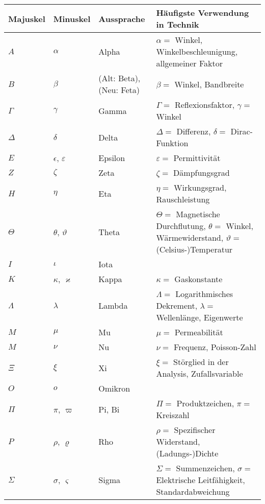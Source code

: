 \begin{tabular}{|l|l|l|m{8.8cm}|}
	\hline
	\textbf{Majuskel}	& \textbf{Minuskel}			& \textbf{Aussprache}		& \textbf{Häufigste Verwendung in Technik} \\[3pt]
	\hline
	$A$ 				& $\alpha$					& Alpha						& $\alpha =$ Winkel, Winkelbeschleunigung, allgemeiner Faktor \\[3pt]
	$B$ 				& $\beta$					& (Alt: Beta), (Neu: Feta)	& $\beta =$ Winkel, Bandbreite\\[3pt]
	$\Gamma$			& $\gamma$					& Gamma						& $\Gamma =$ Reflexionsfaktor, $\gamma =$ Winkel \\[3pt]
	$\Delta$			& $\delta$					& Delta						& $\Delta =$ Differenz, $\delta =$ Dirac-Funktion \\[3pt]
	$E$					& $\epsilon$, $\varepsilon$	& Epsilon 					& $\varepsilon =$ Permittivität \\[3pt]
	$Z$					& $\zeta$					& Zeta 						& $\zeta =$ Dämpfungsgrad \\[3pt]
	$H$					& $\eta$					& Eta 						& $\eta =$ Wirkungsgrad, Rauschleistung \\[3pt]
	$\Theta$			& $\theta$, $\vartheta$		& Theta 					& $\Theta =$ Magnetische Durchflutung, $\theta =$ Winkel, Wärmewiderstand, $\vartheta =$ (Celsius-)Temperatur \\[3pt]
	$I$					& $\iota$					& Iota 						&  \\[3pt]
	$K$					& $\kappa$, $\varkappa$		& Kappa 					& $\kappa =$ Gaskonstante \\[3pt]
	$\Lambda$			& $\lambda$					& Lambda 					& $\Lambda =$ Logarithmisches Dekrement, $\lambda =$ Wellenlänge, Eigenwerte \\[3pt]
	$M$					& $\mu$						& Mu 						& $\mu =$ Permeabilität \\[3pt]
	$M$					& $\nu$						& Nu 						& $\nu =$ Frequenz, Poisson-Zahl \\[3pt]
	$\Xi$				& $\xi$						& Xi 						& $\xi =$ Störglied in der Analysis, Zufallsvariable \\[3pt]
	$O$ 				& $o$ 						& Omikron 					&  \\[3pt]
	$\Pi$				& $\pi$, $\varpi$			& Pi, Bi					& $\Pi =$ Produktzeichen, $\pi =$ Kreiszahl \\[3pt]
	$P$					& $\rho$, $\varrho$			& Rho 						& $\rho =$ Spezifischer Widerstand, (Ladungs-)Dichte \\[3pt]
	$\Sigma$			& $\sigma$, $\varsigma$		& Sigma 					& $\Sigma =$ Summenzeichen, $\sigma =$ Elektrische Leitfähigkeit, Standardabweichung \\[3pt]

\end{tabular}
